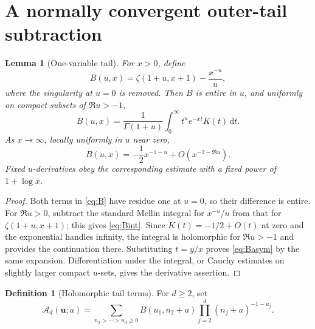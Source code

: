 \documentclass[11pt,a4paper]{article}
\numberwithin{equation}{section}
\newtheorem{lemma}[theorem]{Lemma}
\theoremstyle{definition}\newtheorem{definition}[theorem]{Definition}
\theoremstyle{remark}\newtheorem{remark}[theorem]{Remark}
\newcommand{\Atail}{\mathcal A}
\newcommand{\dd}{\,\mathrm d}
\begin{document}
\section{A normally convergent outer-tail subtraction}
\label{sec:tail}

\begin{lemma}[One-variable tail]\label{lem:tail}
For $x>0$, define
\begin{equation}\label{eq:B}
 B(u,x)=\zeta(1+u,x+1)-\frac{x^{-u}}u,
\end{equation}
where the singularity at $u=0$ is removed. Then $B$ is entire in $u$, and
uniformly on compact subsets of $\Re u>-1$,
\begin{equation}\label{eq:Bint}
 B(u,x)=\frac1{\Gamma(1+u)}
       \int_0^\infty t^u e^{-xt}K(t)\dd t.
\end{equation}
As $x\to\infty$, locally uniformly in $u$ near zero,
\begin{equation}\label{eq:Basym}
 B(u,x)=-\frac12x^{-1-u}+O(x^{-2-\Re u}).
\end{equation}
Fixed $u$-derivatives obey the corresponding estimate with a fixed power
of $1+\log x$.
\end{lemma}
\begin{proof}
Both terms in \eqref{eq:B} have residue one at $u=0$, so their difference
is entire. For $\Re u>0$, subtract the standard Mellin integral for
$x^{-u}/u$ from that for $\zeta(1+u,x+1)$; this gives
\eqref{eq:Bint}. Since $K(t)=-1/2+O(t)$ at zero and the exponential handles
infinity, the integral is holomorphic for $\Re u>-1$ and provides the
continuation there. Substituting $t=y/x$ proves \eqref{eq:Basym} by the
same expansion. Differentiation under the integral, or Cauchy estimates
on slightly larger compact $u$-sets, gives the derivative assertion.
\end{proof}

\begin{definition}[Holomorphic tail terms]\label{def:A}
For $d\ge2$, set
\begin{equation}\label{eq:Ad}
 \Atail_d(\bm u;a)=
 \sum_{n_2>\cdots>n_d\ge0}
 B(u_1,n_2+a)\prod_{j=2}^{d}(n_j+a)^{-1-u_j}.
\end{equation}
\end{definition}
\end{document}
